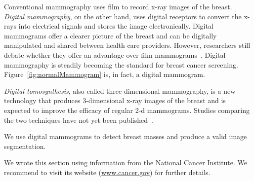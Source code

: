 Conventional mammography uses film to record x-ray images of the breast. \emph{Digital mammography}, on the other hand, uses digital receptors to convert the x-rays into electrical signals and stores the image electronically. Digital mammograms offer a clearer picture of the breast and can be digitally manipulated and shared between health care providers.
However, researchers still debate whether they offer an advantage over film mammograms~\cite{Kerlikowske2011, Pisano2008, Skaane2007}. Digital mammography is steadily becoming the standard for breast cancer screening. Figure~\ref{fig:normalMammogram} is, in fact, a digital mammogram.

\emph{Digital tomosynthesis}, also called three-dimensional mammography, is a new technology that produces 3-dimensional x-ray images of the breast and is expected to improve the efficacy of regular 2-d mammograms. Studies comparing the two techniques have not yet been published~\cite{NCI2014}.

We use digital mammograms to detect breast masses and produce a valid image segmentation.

We wrote this section using information from the National Cancer Institute. We recommend to visit its website (\url{www.cancer.gov}) for further details.
